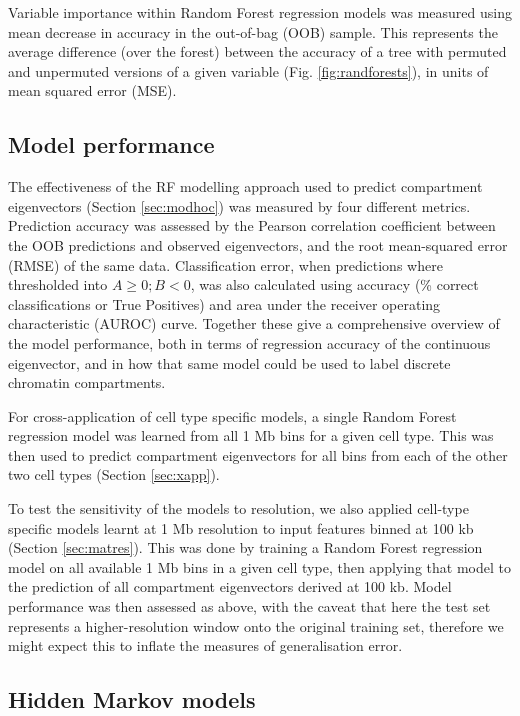 \documentclass[a4paper,11pt,oneside]{book}
\begin{document}
Variable importance within Random Forest regression models was measured
using mean decrease in accuracy in the out-of-bag (OOB) sample. This
represents the average difference (over the forest) between the accuracy
of a tree with permuted and unpermuted versions of a given variable (Fig. \ref{fig:randforests}), in
units of mean squared error (MSE).\citep{Cutler2007, Dasgupta2012}

\subsection{Model performance}\label{sec:modelperf}

The effectiveness of the RF modelling approach used to predict compartment eigenvectors (Section \ref{sec:modhoc}) was measured by four
different metrics. Prediction accuracy was assessed by the Pearson
correlation coefficient between the OOB predictions and observed eigenvectors, and the root mean-squared
error (RMSE) of the same data. Classification error, when predictions
where thresholded into $A \geq 0; B < 0$, was also calculated using
accuracy (\% correct classifications or True Positives) and area under
the receiver operating characteristic (AUROC) curve. Together these give
a comprehensive overview of the model performance, both in terms of
regression accuracy of the continuous eigenvector, and in how that same
model could be used to label discrete chromatin compartments.

For cross-application of cell type specific models, a single Random
Forest regression model was learned from all 1 Mb bins for a given cell
type. This was then used to predict compartment eigenvectors for all bins from each of the other two
cell types (Section \ref{sec:xapp}).

To test the sensitivity of the models to resolution, we also applied cell-type specific models learnt at 1 Mb resolution to input features binned at 100 kb (Section \ref{sec:matres}). This was done by training a Random Forest regression model on all available 1 Mb bins in a given cell type, then applying that model to the prediction of all compartment eigenvectors derived at 100 kb. Model performance was then assessed as above, with the caveat that here the test set represents a higher-resolution window onto the original training set, therefore we might expect this to inflate the measures of generalisation error.

\subsection{Hidden Markov models}\label{meth:hmm}
\end{document}

